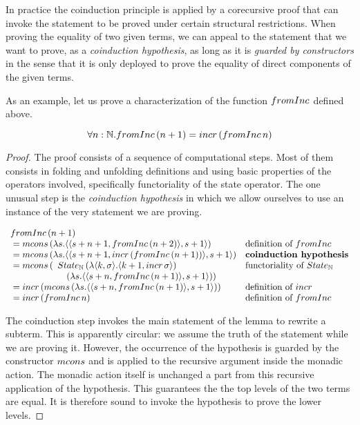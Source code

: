 In practice the coinduction principle is applied by a corecursive proof that can invoke the statement to be proved under certain structural restrictions.
When proving the equality of two given terms, we can appeal to the statement that we want to prove, as a {\em coinduction hypothesis}, as long as it is {\em guarded by constructors} in the sense that it is only deployed to prove the equality of direct components of the given terms.

As an example,
let us prove a characterization of the function $\frominc$ defined above.
\begin{lemma}
$$
\forall n:\nat. \frominc\,(n+1) = \incr\,(\frominc\,n)
$$
\end{lemma}
\begin{proof}
The proof consists of a sequence of computational steps.
Most of them consists in folding and unfolding definitions and using basic properties of the operators involved, specifically functoriality of the state operator.
The one unusual step is the {\em coinduction hypothesis} in which we allow ourselves to use an instance of the very statement we are proving.

$$
\begin{array}{ll}
\frominc\,(n+1)\\
{}= \mcons\, (\lambda s. \pair{\pair{s+n+1}{\frominc\, (n + 2)}}{s + 1})
  & \mbox{definition of }\frominc\\
{}= \mcons\, (\lambda s. \pair{\pair{s+n+1}{\incr\,(\frominc\,(n+1))}}{s + 1})
  & \mbox{\bf coinduction hypothesis}\\
{}= \mcons\,(
    \begin{array}[t]{l}
    \state_\nat\,(\lambda \pair{k}{\sigma}. \pair{k+1}{\incr\,\sigma})\\
    \quad (\lambda s. \pair{\pair{s+n}{\frominc\,(n+1)}}{s + 1}))
    \end{array}
  & \mbox{functoriality of }\state_\nat\\
{}= \incr\,(\mcons\,(\lambda s. \pair{\pair{s+n}{\frominc\,(n+1)}}{s + 1}))
  & \mbox{definition of }\incr\\
{}= \incr\,(\frominc\,n)
  & \mbox{definition of }\frominc
\end{array}
$$

The coinduction step invokes the main statement of the lemma to rewrite a subterm.
This is apparently circular: we assume the truth of the statement while we are proving it.
However, the occurrence of the hypothesis is guarded by the constructor $\mcons$ and is applied to the recursive argument inside the monadic action.
The monadic action itself is unchanged a part from this recursive application of the hypothesis.
This guarantees the the top levels of the two terms are equal.
It is therefore sound to invoke the hypothesis to prove the lower levels.
\end{proof}

